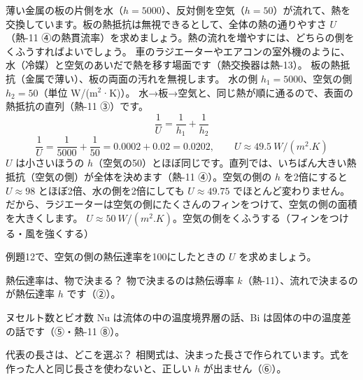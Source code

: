 \label{ph:熱-12:ex12}
\begin{phreidai}
薄い金属の板の片側を水（$h=5000$）、反対側を空気（$h=50$）が流れて、熱を交換しています。板の熱抵抗は無視できるとして、全体の熱の通りやすさ $U$（熱-11 ④の熱貫流率）を求めましょう。熱の流れを増やすには、どちらの側をくふうすればよいでしょう。
\phbamen
車のラジエーターやエアコンの室外機のように、水（冷媒）と空気のあいだで熱を移す場面です（熱交換器は熱-13）。
\phmushi
板の熱抵抗（金属で薄い）、板の両面の汚れを無視します。
\phzu
水の側 $h_1=5000$、空気の側 $h_2=50$（単位 W/(m$^2$·K)）。
\phriyu
水→板→空気と、同じ熱が順に通るので、表面の熱抵抗の直列（熱-11 ③）です。
\phtateru
\[\frac{1}{U}=\frac{1}{h_1}+\frac{1}{h_2}\]
\phtoku
\[\frac{1}{U}=\frac{1}{5000}+\frac{1}{50}=0.0002+0.02=0.0202,\qquad U\approx\qty{49.5}{W/(m^2.K)}\]
\phtashikame
$U$ は小さいほうの $h$（空気の50）とほぼ同じです。直列では、いちばん大きい熱抵抗（空気の側）が全体を決めます（熱-11 ④）。空気の側の $h$ を2倍にすると $U\approx98$ とほぼ2倍、水の側を2倍にしても $U\approx49.75$ でほとんど変わりません。だから、ラジエーターは空気の側にたくさんのフィンをつけて、空気の側の面積を大きくします。
\kotae $U\approx\qty{50}{W/(m^2.K)}$。空気の側をくふうする（フィンをつける・風を強くする）
\end{phreidai}
\begin{jibun}
例題12で、空気の側の熱伝達率を100にしたときの $U$ を求めましょう。
\end{jibun}

\begin{tsumazuki}{熱伝達率は、物で決まる？}
物で決まるのは熱伝導率 $k$（熱-11）、流れで決まるのが熱伝達率 $h$ です（②）。
\end{tsumazuki}

\begin{tsumazuki}{ヌセルト数とビオ数}
Nu は流体の中の温度境界層の話、Bi は固体の中の温度差の話です（⑤・熱-11 ⑧）。
\end{tsumazuki}

\begin{tsumazuki}{代表の長さは、どこを選ぶ？}
相関式は、決まった長さで作られています。式を作った人と同じ長さを使わないと、正しい $h$ が出ません（⑥）。
\end{tsumazuki}

